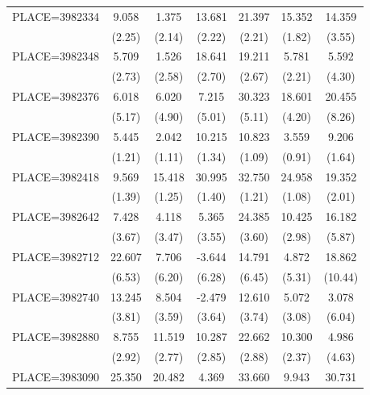 {\begin{tabular}{l*{6}{c}}
PLACE=3982334       &       9.058&       1.375&      13.681&      21.397&      15.352&      14.359\\
                    &      (2.25)&      (2.14)&      (2.22)&      (2.21)&      (1.82)&      (3.55)\\
PLACE=3982348       &       5.709&       1.526&      18.641&      19.211&       5.781&       5.592\\
                    &      (2.73)&      (2.58)&      (2.70)&      (2.67)&      (2.21)&      (4.30)\\
PLACE=3982376       &       6.018&       6.020&       7.215&      30.323&      18.601&      20.455\\
                    &      (5.17)&      (4.90)&      (5.01)&      (5.11)&      (4.20)&      (8.26)\\
PLACE=3982390       &       5.445&       2.042&      10.215&      10.823&       3.559&       9.206\\
                    &      (1.21)&      (1.11)&      (1.34)&      (1.09)&      (0.91)&      (1.64)\\
PLACE=3982418       &       9.569&      15.418&      30.995&      32.750&      24.958&      19.352\\
                    &      (1.39)&      (1.25)&      (1.40)&      (1.21)&      (1.08)&      (2.01)\\
PLACE=3982642       &       7.428&       4.118&       5.365&      24.385&      10.425&      16.182\\
                    &      (3.67)&      (3.47)&      (3.55)&      (3.60)&      (2.98)&      (5.87)\\
PLACE=3982712       &      22.607&       7.706&      -3.644&      14.791&       4.872&      18.862\\
                    &      (6.53)&      (6.20)&      (6.28)&      (6.45)&      (5.31)&     (10.44)\\
PLACE=3982740       &      13.245&       8.504&      -2.479&      12.610&       5.072&       3.078\\
                    &      (3.81)&      (3.59)&      (3.64)&      (3.74)&      (3.08)&      (6.04)\\
PLACE=3982880       &       8.755&      11.519&      10.287&      22.662&      10.300&       4.986\\
                    &      (2.92)&      (2.77)&      (2.85)&      (2.88)&      (2.37)&      (4.63)\\
PLACE=3983090       &      25.350&      20.482&       4.369&      33.660&       9.943&      30.731\\

\end{tabular}}
